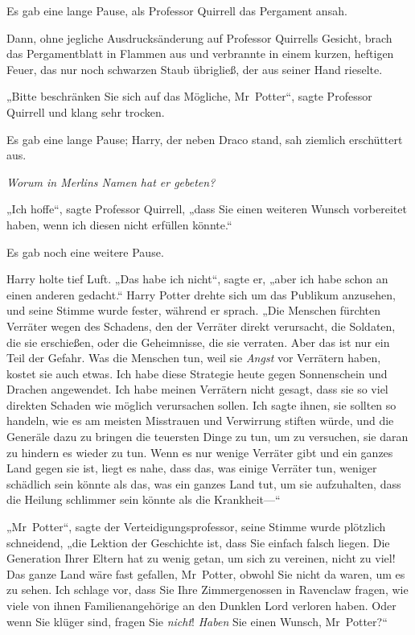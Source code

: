 {Es gab eine lange Pause, als Professor Quirrell das Pergament ansah.

Dann, ohne jegliche Ausdrucksänderung auf Professor Quirrells Gesicht, brach das Pergamentblatt in Flammen aus und verbrannte in einem kurzen, heftigen Feuer, das nur noch schwarzen Staub übrigließ, der aus seiner Hand rieselte.

„Bitte beschränken Sie sich auf das Mögliche, Mr~Potter“, sagte Professor Quirrell und klang sehr trocken.

Es gab eine lange Pause; Harry, der neben Draco stand, sah ziemlich erschüttert aus.

\emph{Worum in Merlins Namen hat er gebeten?}

„Ich hoffe“, sagte Professor Quirrell, „dass Sie einen weiteren Wunsch vorbereitet haben, wenn ich diesen nicht erfüllen könnte.“

Es gab noch eine weitere Pause.

Harry holte tief Luft. „Das habe ich nicht“, sagte er, „aber ich habe schon an einen anderen gedacht.“ Harry Potter drehte sich um das Publikum anzusehen, und seine Stimme wurde fester, während er sprach. „Die Menschen fürchten Verräter wegen des Schadens, den der Verräter direkt verursacht, die Soldaten, die sie erschießen, oder die Geheimnisse, die sie verraten. Aber das ist nur ein Teil der Gefahr. Was die Menschen tun, weil sie \emph{Angst} vor Verrätern haben, kostet sie auch etwas. Ich habe diese Strategie heute gegen Sonnenschein und Drachen angewendet. Ich habe meinen Verrätern nicht gesagt, dass sie so viel direkten Schaden wie möglich verursachen sollen. Ich sagte ihnen, sie sollten so handeln, wie es am meisten Misstrauen und Verwirrung stiften würde, und die Generäle dazu zu bringen die teuersten Dinge zu tun, um zu versuchen, sie daran zu hindern es wieder zu tun. Wenn es nur wenige Verräter gibt und ein ganzes Land gegen sie ist, liegt es nahe, dass das, was einige Verräter tun, weniger schädlich sein könnte als das, was ein ganzes Land tut, um sie aufzuhalten, dass die Heilung schlimmer sein könnte als die Krankheit—“

„Mr~Potter“, sagte der Verteidigungsprofessor, seine Stimme wurde plötzlich schneidend, „die Lektion der Geschichte ist, dass Sie einfach falsch liegen. Die Generation Ihrer Eltern hat zu wenig getan, um sich zu vereinen, nicht zu viel! Das ganze Land wäre fast gefallen, Mr~Potter, obwohl Sie nicht da waren, um es zu sehen. Ich schlage vor, dass Sie Ihre Zimmergenossen in Ravenclaw fragen, wie viele von ihnen Familienangehörige an den Dunklen Lord verloren haben. Oder wenn Sie klüger sind, fragen Sie \emph{nicht}! \emph{Haben} Sie einen Wunsch, Mr~Potter?“

}
